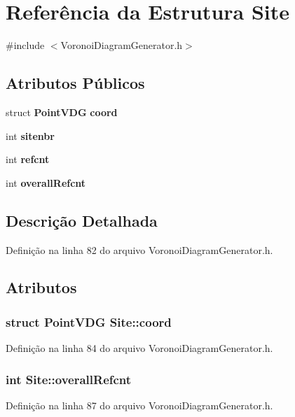 \section{Referência da Estrutura Site}
\label{struct_site}


{\ttfamily \#include $<$Voronoi\+Diagram\+Generator.\+h$>$}

\subsection*{Atributos Públicos}
\begin{DoxyCompactItemize}
\item 
struct {\bf Point\+V\+DG} {\bf coord}
\item 
int {\bf sitenbr}
\item 
int {\bf refcnt}
\item 
int {\bf overall\+Refcnt}
\end{DoxyCompactItemize}


\subsection{Descrição Detalhada}


Definição na linha 82 do arquivo Voronoi\+Diagram\+Generator.\+h.



\subsection{Atributos}
\subsubsection[{coord}]{\setlength{\rightskip}{0pt plus 5cm}struct {\bf Point\+V\+DG} Site\+::coord}\label{struct_site_a1700dce3d5a9c914b1b992a65da6af8e}


Definição na linha 84 do arquivo Voronoi\+Diagram\+Generator.\+h.

\subsubsection[{overall\+Refcnt}]{\setlength{\rightskip}{0pt plus 5cm}int Site\+::overall\+Refcnt}\label{struct_site_ae1a71b978212eaeb60981205bf2f1928}


Definição na linha 87 do arquivo Voronoi\+Diagram\+Generator.\+h.

